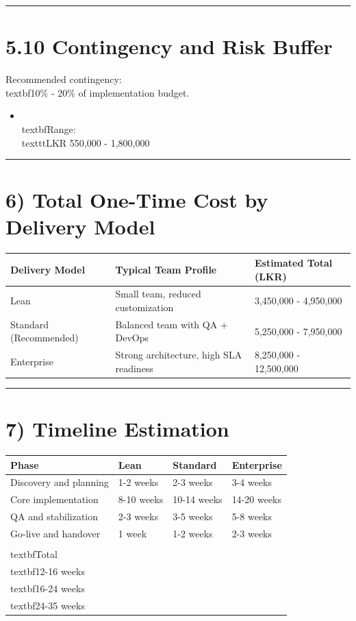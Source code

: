 \documentclass[11pt,a4paper]{article}
\begin{document}
\bigskip\hrule\bigskip

\section{5.10 Contingency and Risk Buffer}

Recommended contingency: \\textbf{10\% - 20\%} of implementation budget.\\

\begin{itemize}
\item \\textbf{Range:} \\texttt{LKR 550,000 - 1,800,000}
\end{itemize}

\bigskip\hrule\bigskip

\section{6) Total One-Time Cost by Delivery Model}

\begin{longtable}{p{} | p{} | p{}}
\toprule
Delivery Model & Typical Team Profile & Estimated Total (LKR) \\
\midrule
Lean & Small team, reduced customization & 3,450,000 - 4,950,000 \\
Standard (Recommended) & Balanced team with QA + DevOps & 5,250,000 - 7,950,000 \\
Enterprise & Strong architecture, high SLA readiness & 8,250,000 - 12,500,000 \\
\bottomrule
\end{longtable}

\bigskip\hrule\bigskip

\section{7) Timeline Estimation}

\begin{longtable}{p{} | p{} | p{} | p{}}
\toprule
Phase & Lean & Standard & Enterprise \\
\midrule
Discovery and planning & 1-2 weeks & 2-3 weeks & 3-4 weeks \\
Core implementation & 8-10 weeks & 10-14 weeks & 14-20 weeks \\
QA and stabilization & 2-3 weeks & 3-5 weeks & 5-8 weeks \\
Go-live and handover & 1 week & 1-2 weeks & 2-3 weeks \\
\\textbf{Total} & \\textbf{12-16 weeks} & \\textbf{16-24 weeks} & \\textbf{24-35 weeks} \\
\bottomrule
\end{longtable}
\end{document}
